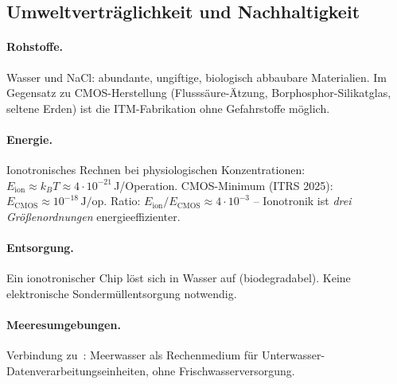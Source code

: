﻿\documentclass[a4paper,12pt]{article}
\theoremstyle{plain}
\theoremstyle{definition}
\theoremstyle{remark}
\begin{document}
\subsection{Umweltvertr\"aglichkeit und Nachhaltigkeit}

\paragraph{Rohstoffe.}
Wasser und NaCl: abundante, ungiftige, biologisch abbaubare Materialien.
Im Gegensatz zu CMOS-Herstellung (Flusss\"aure-\"Atzung, Borphosphor-Silikatglas,
seltene Erden) ist die ITM-Fabrikation ohne Gefahrstoffe m\"oglich.

\paragraph{Energie.}
Ionotronisches Rechnen bei physiologischen Konzentrationen:
$E_{\mathrm{ion}} \approx k_BT \approx 4 \cdot 10^{-21}\,$J/Operation.
CMOS-Minimum (ITRS 2025): $E_{\mathrm{CMOS}} \approx 10^{-18}\,\text{J/op}$.
Ratio: $E_{\mathrm{ion}}/E_{\mathrm{CMOS}} \approx 4 \cdot 10^{-3}$
-- Ionotronik ist \emph{drei Gr\"o{\ss}enordnungen} energieeffizienter.

\paragraph{Entsorgung.}
Ein ionotronischer Chip l\"ost sich in Wasser auf (biodegradabel).
Keine elektronische Sonderm\"ullentsorgung notwendig.

\paragraph{Meeresumgebungen.}
Verbindung zu~\cite{epp2026cleanocn}: Meerwasser als Rechenmedium
f\"ur Unterwasser-Datenverarbeitungseinheiten, ohne Frischwasserversorgung.
\end{document}
